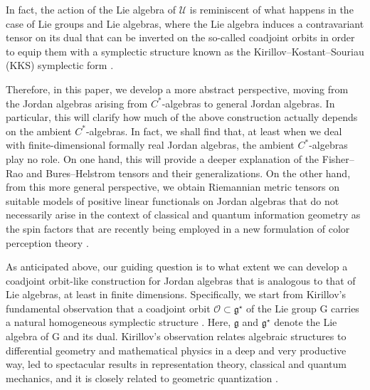 \documentclass[pdftex]{sigma}
\numberwithin{equation}{section}
\newcommand{\ocal}{\mathcal{O}}
\newcommand{\G}{\mathrm{G}}
\newcommand{\g}{{\mathfrak{g}}}
\begin{document}
In fact, the action of the Lie algebra of $\mathscr{U}$ is reminiscent of what happens in the case of Lie groups and Lie algebras, where the Lie algebra induces a contravariant tensor on its dual that can be inverted on the so-called coadjoint orbits in order to equip them with a symplectic structure known as the Kirillov--Kostant--Souriau (KKS) symplectic form \cite{Kirillov-1962,Kirillov-1976,Kostant-1970,Souriau-1970}.


Therefore, in this paper, we develop a more abstract perspective, moving from the Jordan algebras arising from $C^{*}$-algebras to general Jordan algebras. In particular, this will clarify how much of the above construction actually depends on the ambient $C^{*}$-algebras.
In fact, we shall find that, at least when we deal with finite-dimensional formally real Jordan algebras, the ambient $C^{*}$-algebras play no role.
On one hand, this will provide a deeper explanation of the Fisher--Rao and Bures--Helstrom tensors and their generalizations. On the other hand, from
 this more general perspective, we obtain Riemannian metric tensors on suitable models of positive linear functionals on Jordan algebras that do not necessarily arise in the context of classical and quantum information geometry as the spin factors that are recently being employed in a new formulation of color perception theory \cite{Berthier-2020,B-P-P-2022,B-P-2022,Provenzi-2020,Resnikoff-1974}.

As anticipated above, our guiding question is to what extent we can develop a coadjoint orbit-like construction for Jordan algebras that is analogous to that of Lie algebras, at least in finite dimensions.
Specifically, we start from Kirillov's fundamental observation that a coadjoint orbit $\ocal \subset \g^\star$ of the Lie group $\G$ carries a natural homogeneous symplectic structure \cite{Kirillov-1962,Kirillov-1976}.
Here, $\g$ and $\g^\star$ denote the Lie algebra of $\G$ and its dual.
Kirillov's observation relates algebraic structures to differential geometry and mathematical physics in a deep and very productive way, led to spectacular results in representation theory, classical and quantum mechanics, and it is closely related to geometric quantization \cite{Kirillov-2001}.
\end{document}
